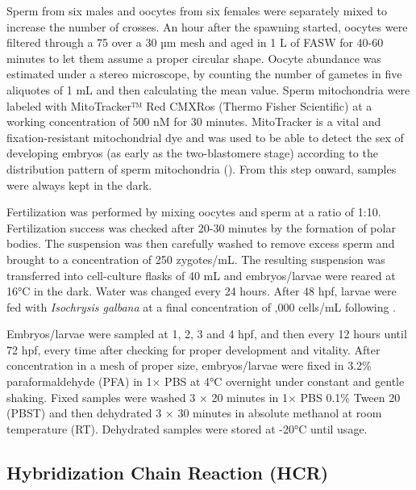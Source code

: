 \documentclass[../main.tex]{subfiles}
\begin{document}
Sperm from six males and oocytes from six females were separately mixed to increase the number of crosses. An hour after the spawning started, oocytes were filtered through a 75 over a 30 µm mesh and aged in 1 L of FASW for 40-60 minutes to let them assume a proper circular shape. Oocyte abundance was estimated under a stereo microscope, by counting the number of gametes in five aliquotes of 1 mL and then calculating the mean value. Sperm mitochondria were labeled with MitoTracker™ Red CMXRos (Thermo Fisher Scientific) at a working concentration of 500 nM for 30 minutes. MitoTracker is a vital and fixation-resistant mitochondrial dye and was used to be able to detect the sex of developing embryos (as early as the two-blastomere stage) according to the distribution pattern of sperm mitochondria (\textbf{\cite{cao2004differential,obata2005specific}}). From this step onward, samples were always kept in the dark.

Fertilization was performed by mixing oocytes and sperm at a ratio of 1:10. Fertilization success was checked after 20-30 minutes by the formation of polar bodies. The suspension was then carefully washed to remove excess sperm and brought to a concentration of 250 zygotes/mL. The resulting suspension was transferred into cell-culture flasks of 40 mL and embryos/larvae were reared at 16°C in the dark. Water was changed every 24 hours. After 48 hpf, larvae were fed with \textit{Isochrysis galbana} at a final concentration of ,000 cells/mL following \textbf{\cite{helm2004hatchery}}.

Embryos/larvae were sampled at 1, 2, 3 and 4 hpf, and then every 12 hours until 72 hpf, every time after checking for proper development and vitality. After concentration in a mesh of proper size, embryos/larvae were fixed in 3.2\% paraformaldehyde (PFA) in 1× PBS at 4°C overnight under constant and gentle shaking. Fixed samples were washed 3 × 20 minutes in 1× PBS 0.1\% Tween 20 (PBST) and then dehydrated 3 × 30 minutes in absolute methanol at room temperature (RT). Dehydrated samples were stored at -20°C until usage.

\subsection{Hybridization Chain Reaction (HCR)} \label{hcr_MM}
\end{document}
